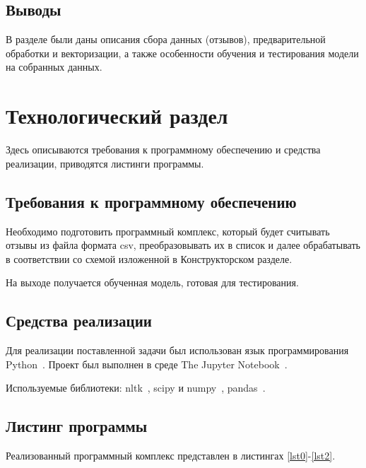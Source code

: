 \documentclass[a4paper,12pt]{article}
\begin{document}
	\subsection*{Выводы}
	
	В разделе были даны описания сбора данных (отзывов), предварительной обработки и векторизации, а также особенности обучения и тестирования модели на собранных данных.
	
	\newpage
	
	\section{Технологический раздел}
	
	Здесь описываются требования к программному 
	обеспечению и средства реализации, приводятся листинги 
	программы.
	
	\subsection{Требования к программному обеспечению}
	
	Необходимо подготовить программный комплекс, который будет считывать отзывы из файла формата csv, преобразовывать их в список и далее обрабатывать в соответствии со схемой изложенной в Конструкторском разделе.
	
	На выходе получается обученная модель, готовая для тестирования.
	
	\subsection{Средства реализации}
	
	Для реализации поставленной задачи был использован язык программирования Python~\cite{python}. Проект был выполнен в среде The Jupyter Notebook~\cite{notebook}.
	
	Используемые библиотеки: nltk~\cite{nltk}, scipy и numpy~\cite{scipy_numpy}, pandas~\cite{pandas}.
	
	\subsection{Листинг программы}
	
	Реализованный программный комплекс представлен
	в листингах \ref{lst0}-\ref{lst2}.
	
\end{document}

